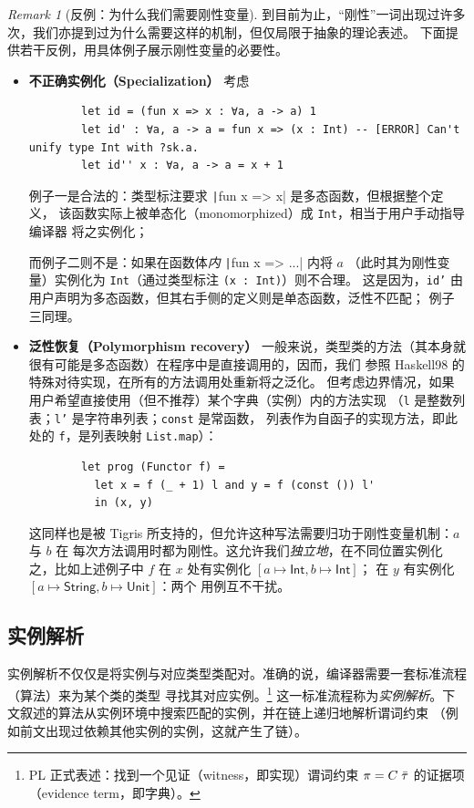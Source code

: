 \documentclass[a4paper, 11pt]{article}
\theoremstyle{remark}\newtheorem*{remark}{Remark}
\theoremstyle{definition}\newtheorem*{definition}{Definition}
\begin{document}
\begin{remark}[反例：为什么我们需要刚性变量]
  到目前为止，“刚性”一词出现过许多次，我们亦提到过为什么需要这样的机制，但仅局限于抽象的理论表述。
  下面提供若干反例，用具体例子展示刚性变量的必要性。
  \begin{itemize}
    \item \textbf{不正确实例化（Specialization）} 考虑
      \begin{verbatim}
        let id = (fun x => x : ∀a, a -> a) 1
        let id' : ∀a, a -> a = fun x => (x : Int) -- [ERROR] Can't unify type Int with ?sk.a.
        let id'' x : ∀a, a -> a = x + 1
      \end{verbatim}

      例子一是合法的：类型标注要求 \texttt|fun x => x| 是多态函数，但根据整个定义，
      该函数实际上被单态化（monomorphized）成 \texttt{Int}，相当于用户手动指导编译器
      将之实例化；

      而例子二则不是：如果在函数体\emph{内} \texttt|fun x => ...| 内将 $a$
      （此时其为刚性变量）实例化为 \texttt{Int}（通过类型标注 \texttt{(x : Int)}）则不合理。
      这是因为，\texttt{id'} 由用户声明为多态函数，但其右手侧的定义则是单态函数，泛性不匹配；
      例子三同理。

    \item \textbf{泛性恢复（Polymorphism recovery）}
      一般来说，类型类的方法（其本身就很有可能是多态函数）在程序中是直接调用的，因而，我们
      参照 Haskell98 的特殊对待实现，在所有的方法调用处重新将之泛化。
      但考虑边界情况，如果用户希望直接使用（但不推荐）某个字典（实例）内的方法实现
      （\texttt{l} 是整数列表；\texttt{l'} 是字符串列表；\texttt{const} 是常函数，
      列表作为自函子的实现方法，即此处的 \texttt{f}，是列表映射 \texttt{List.map}）：
      \begin{verbatim}
        let prog (Functor f) =
          let x = f (_ + 1) l and y = f (const ()) l'
          in (x, y)
      \end{verbatim}
      这同样也是被 Tigris 所支持的，但允许这种写法需要归功于刚性变量机制：$a$ 与 $b$ 在
      每次方法调用时都为刚性。这允许我们\emph{独立地}，在不同位置实例化之，比如上述例子中
      $f$ 在 $x$ 处有实例化 \([a\mapsto \mathsf{Int}, b\mapsto\mathsf{Int}]\)；
      在 $y$ 有实例化 \([a\mapsto \mathsf{String}, b\mapsto\mathsf{Unit}]\)：两个
      用例互不干扰。
  \end{itemize}
\end{remark}

\subsection{实例解析}
实例解析不仅仅是将实例与对应类型类配对。准确的说，编译器需要一套标准流程（算法）来为某个类的类型
寻找其对应实例。\footnote{
  PL 正式表述：找到一个见证（witness，即实现）谓词约束 \(\pi = C\;\bar{\tau}\)
  的证据项（evidence term，即字典）。
} 这一标准流程称为\emph{实例解析}。下文叙述的算法从实例环境中搜索匹配的实例，并在链上递归地解析谓词约束
（例如前文出现过依赖其他实例的实例，这就产生了链）。
\end{document}
